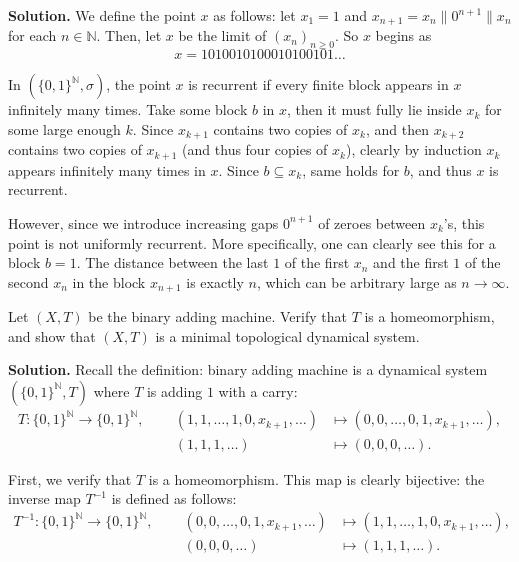 \documentclass{template}
\begin{document}
\textbf{Solution.} We define the point $x$ as follows: let $x_1 = 1$ and $x_{n+1} = x_{n} \parallel 0^{n+1} \parallel x_{n}$
for each $n \in \mathbb{N}$. Then, let $x$ be the limit of $(x_n)_{n \geq 0}$. So $x$ begins as 
\begin{equation*}
    x = 1010010100010100101\dots
\end{equation*}

In $(\{0,1\}^{\mathbb{N}},\sigma)$, the point $x$ is recurrent if every finite block 
appears in $x$ infinitely many times. Take some block $b$ in $x$, then it must 
fully lie inside $x_k$ for some large enough $k$. Since $x_{k+1}$ contains two 
copies of $x_k$, and then $x_{k+2}$ contains two copies of $x_{k+1}$ (and thus 
four copies of $x_k$), clearly by induction $x_k$ appears infinitely many times in $x$.
Since $b \subseteq x_k$, same holds for $b$, and thus $x$ is recurrent.

However, since we introduce increasing gaps $0^{n+1}$ of zeroes between $x_k$'s,
this point is not uniformly recurrent. More specifically, one can clearly see
this for a block $b=1$. The distance between the last $1$ of the first $x_n$ and
the first $1$ of the second $x_n$ in the block $x_{n+1}$ is exactly $n$, which
can be arbitrary large as $n \to \infty$.

\begin{problem}[Exercise 3]
    Let $(X,T)$ be the binary adding machine. Verify that $T$ is a homeomorphism,
    and show that $(X,T)$ is a minimal topological dynamical system.
\end{problem}

\textbf{Solution.} Recall the definition: binary adding machine is a dynamical
system $(\{0,1\}^{\mathbb{N}}, T)$ where $T$ is adding $1$ with a carry:
\begin{align*}
    T: \{0,1\}^{\mathbb{N}} \to \{0,1\}^{\mathbb{N}}, && \;\;(1,1,\dots,1,0,x_{k+1},\dots) &\mapsto (0,0,\dots,0,1,x_{k+1},\dots), \\
    &&\;\;(1,1,1,\dots) &\mapsto (0,0,0,\dots).
\end{align*}

First, we verify that $T$ is a homeomorphism. This map is clearly bijective: the
inverse map $T^{-1}$ is defined as follows:
\begin{align*}
    T^{-1}: \{0,1\}^{\mathbb{N}} \to \{0,1\}^{\mathbb{N}}, && \;\;(0,0,\dots,0,1,x_{k+1},\dots) &\mapsto (1,1,\dots,1,0,x_{k+1},\dots), \\
    &&\;\;(0,0,0,\dots) &\mapsto (1,1,1,\dots).
\end{align*}
\end{document}
